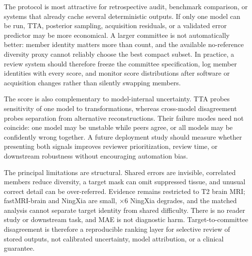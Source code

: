 \documentclass{article}
\begin{document}
The protocol is most attractive for retrospective audit, benchmark comparison, or systems that already cache several deterministic outputs. If only one model can be run, TTA, posterior sampling, acquisition residuals, or a validated error predictor may be more economical. A larger committee is not automatically better: member identity matters more than count, and the available no-reference diversity proxy cannot reliably choose the best compact subset. In practice, a review system should therefore freeze the committee specification, log member identities with every score, and monitor score distributions after software or acquisition changes rather than silently swapping members.

The score is also complementary to model-internal uncertainty. TTA probes sensitivity of one model to transformations, whereas cross-model disagreement probes separation from alternative reconstructions. Their failure modes need not coincide: one model may be unstable while peers agree, or all models may be confidently wrong together. A future deployment study should measure whether presenting both signals improves reviewer prioritization, review time, or downstream robustness without encouraging automation bias.

The principal limitations are structural. Shared errors are invisible, correlated members reduce diversity, a target mask can omit suppressed tissue, and unusual correct detail can be over-referred. Evidence remains restricted to T2 brain MRI; fastMRI-brain and NingXia are small, $\times6$ NingXia degrades, and the matched analysis cannot separate target identity from shared difficulty. There is no reader study or downstream task, and MAE is not diagnostic harm. Target-to-committee disagreement is therefore a reproducible ranking layer for selective review of stored outputs, not calibrated uncertainty, model attribution, or a clinical guarantee.

\clearpage


\end{document}
